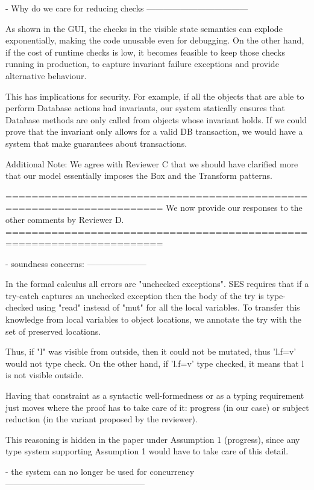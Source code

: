 - Why do we care for reducing checks
------------------------------------

As shown in the GUI, the checks in the visible state semantics can explode
exponentially, making the code unusable even for debugging.
On the other hand, if the cost of runtime checks is low,
it becomes feasible to keep those checks running in production,
to capture invariant failure exceptions and provide alternative behaviour.

This has implications for security.
For example, if all the objects that are able to perform Database actions had invariants,
our system statically ensures that Database methods are only called from objects whose invariant holds.
If we could prove that the invariant only allows for a valid DB transaction, we would have a system
that make guarantees about transactions.

Additional Note: We agree with Reviewer C that we should have clarified more that our model essentially imposes the Box and the Transform patterns.


======================================================================
We now provide our responses to the other comments by Reviewer D.
======================================================================

- soundness concerns:
---------------------

In the formal calculus all errors are "unchecked exceptions".
SES requires that if a try-catch captures an unchecked exception then the body of the try
is type-checked using "read" instead of "mut" for all the local variables.
To transfer this knowledge from local variables to object locations, we annotate the try with
the set of preserved locations.

Thus, if "l" was visible from outside, then it could not be mutated, thus 'l.f=v' would not type check.
On the other hand, if 'l.f=v' type checked, it means that l is not visible outside.

Having that constraint as a syntactic well-formedness or as a typing requirement just moves 
where the proof has to take care of it: progress (in our case) or subject reduction
(in the variant proposed by the reviewer).

This reasoning is hidden in the paper under Assumption 1 (progress), since any type system
supporting Assumption 1 would have to take care of this detail.

- the system can no longer be used for concurrency
--------------------------------------------------

